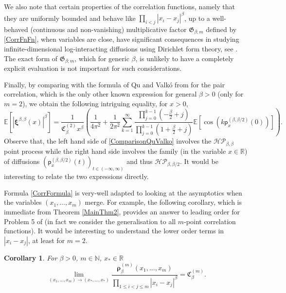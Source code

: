 \documentclass[]{article}
\newtheorem{cor}[thm]{Corollary}
\begin{document}
We also note that certain properties of the correlation functions, namely that they are uniformly bounded and behave like $\prod_{i<j}|x_i-x_j|^\beta$, up to a well-behaved (continuous and non-vanishing) multiplicative factor $\mathfrak{G}_{\beta;m}$ defined by \eqref{CorrFnFn}, when variables are close, have significant consequences in studying infinite-dimensional log-interacting diffusions using Dirichlet form theory, see \cite{Osada1,Osada2}. The exact form of $\mathfrak{G}_{\beta;m}$, which for generic $\beta$, is unlikely to have a completely explicit evaluation is not important for such considerations.

Finally, by comparing with the formula of Qu and Valk\'{o} from \cite{qu2025pair} for the pair correlation, which is the only other known expression for general $\beta>0$ (only for $m=2$), we obtain the following intriguing equality, for $x>0$,
\begin{equation}\label{ComparisonQuValko}
\mathbb{E}\left[\left|\boldsymbol{\xi}^{\beta,\beta}(x)\right|^{\beta}\right]=\frac{1}{\mathfrak{C}_\beta^{(2)}x^\beta}\left(\frac{1}{4\pi^2}+\frac{1}{2\pi^2}\sum_{k=1}^\infty \frac{\prod_{j=0}^{k-1}\left(-\frac{\beta}{2}+j\right)}{\prod_{j=0}^{k-1}\left(1+\frac{\beta}{2}+j\right)}\mathbb{E}\left[\cos \left(k\mathsf{p}_x^{(\beta,\beta/2)}(0)\right)\right]\right).
\end{equation}
Observe that, the left hand side of \eqref{ComparisonQuValko} involves  the $\mathcal{HP}_{\beta,\beta}$ point process while the right hand side involves the family (in the variable $x\in\mathbb{R}$) of diffusions $(\mathsf{p}_x^{(\beta,\beta/2)}(t))_{t\in (-\infty,\infty)}$ and thus $\mathcal{HP}_{\beta,\beta/2}$. It would be interesting to relate the two expressions directly.

Formula \eqref{CorrFormula} is very-well adapted to looking at the asymptotics when the variables $(x_1,\dots,x_m)$ merge. For example, the following corollary, which is immediate from Theorem \ref{MainThm2}, provides an answer to leading order for Problem 5 of \cite{qu2025pair} (in fact we consider the generalisation to all $m$-point correlation functions). It would be interesting to understand the lower order terms in $|x_i-x_j|$, at least for $m=2$.
\begin{cor}
For $\beta>0$, $m\in \mathbb{N}$, $x_*\in \mathbb{R}$
\begin{equation}
\lim_{(x_1,\dots,x_m)\to (x_*,\dots,x_*)}\frac{\boldsymbol{\rho}^{(m)}_\beta(x_1,\dots,x_m)}{\prod_{1 \le i <j \le m} \left|x_i-x_j \right|^\beta}=\mathfrak{C}_\beta^{(m)}.
\end{equation}
\end{cor}
\end{document}
